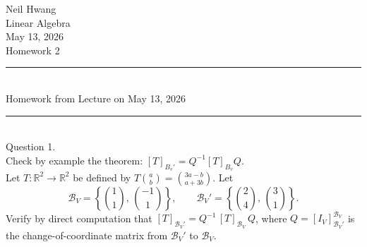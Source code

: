 \documentclass{article}
\begin{document}
\begin{flushright}
Neil Hwang\\
Linear Algebra\\
May 13, 2026\\
Homework 2\\

\end{flushright}




\bigskip
\begin{center}
\rule{0.5\textwidth}{1pt}\\[6pt]
\textnormal{Homework from Lecture on May 13, 2026}\\[2pt]
\rule{0.5\textwidth}{1pt}
\end{center}
\bigskip


\hfill \break  $~\!\!$ \dotfill \medskip \\
\textnormal{Question 1.}\\
Check by example the theorem:
$[T]_{B_v'} = Q^{-1} [T]_{B_v} Q.$\\

Let $T : \mathbb{R}^2 \to \mathbb{R}^2$ be defined by $T\binom{a}{b} = \binom{3a - b}{a + 3b}$.
Let
\[
\mathcal{B}_V = \left\{ \binom{1}{1},\, \binom{-1}{1} \right\}, \qquad
\mathcal{B}_V' = \left\{ \binom{2}{4},\, \binom{3}{1} \right\}.
\]
Verify by direct computation that $[T]_{\mathcal{B}_V'} = Q^{-1}\,[T]_{\mathcal{B}_V}\, Q$, where $Q = [I_V]_{\mathcal{B}_V'}^{\mathcal{B}_V}$ is the change-of-coordinate matrix from $\mathcal{B}_V'$ to $\mathcal{B}_V$.
\end{document}
